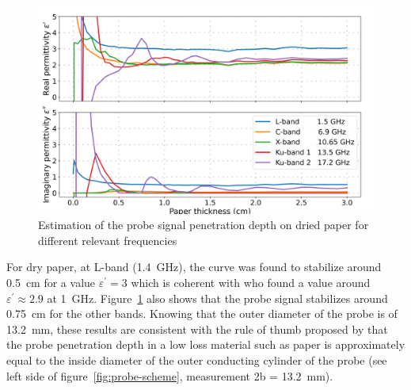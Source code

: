 \begin{figure}[ht!]
    \centering
    \includegraphics[width=\columnwidth]{Images/dry-paper.png}
    \caption[]{Estimation of the probe signal penetration depth on dried paper for different relevant frequencies}\label{fig:dry-paper}
\end{figure}

For dry paper, at L-band (\qty{1.4}{\giga\hertz}), the curve was found to stabilize around \qty{0.5}{\cm} for a value \(\varepsilon^\prime = 3\) which is coherent with \parencite{Elrayes1987} who found a value around \(\varepsilon^\prime\approx2.9\) at \qty{1}{\giga\hertz}.
Figure~\ref{fig:dry-paper} also shows that the probe signal stabilizes around \qty{0.75}{\cm} for the other bands.
Knowing that the outer diameter of the probe is of \qty{13.2}{\mm}, these results are consistent with the rule of thumb proposed by \textcite{Elrayes1987} that the probe penetration depth in a low loss material such as paper is approximately equal to the inside diameter of the outer conducting cylinder of the probe (see left side of figure~\ref{fig:probe-scheme}, measurement 2b = \qty{13.2}{\mm}).

